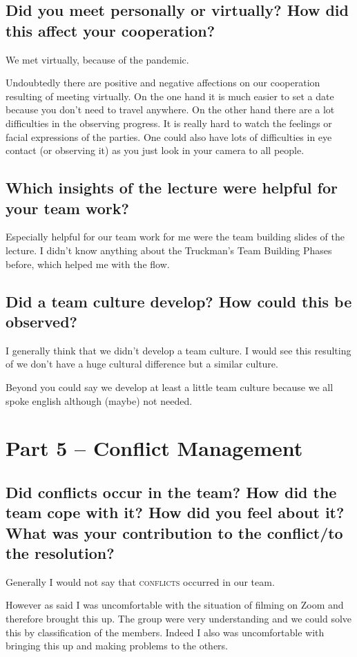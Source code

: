 \documentclass[11pt,fleqn]{book} %
\begin{document}
\subsection{Did you meet personally or virtually? How did this affect your cooperation?}
We met virtually, because of the pandemic.

Undoubtedly there are positive and negative affections on our cooperation resulting of meeting virtually.
On the one hand it is much easier to set a date because you don't need to travel anywhere. On the other hand there are a lot difficulties in the observing progress. It is really hard to watch the feelings or facial expressions of the parties. One could also have lots of difficulties in eye contact (or observing it) as you just look in your camera to all people.

\subsection{Which insights of the lecture were helpful for your team work?}
Especially helpful for our team work for me were the team building slides of the lecture. I didn't know anything about the Truckman's Team Building Phases before, which helped me with the flow.

\subsection{Did a team culture develop? How could this be observed?}
I generally think that we didn't develop a team culture.
I would see this resulting of we don't have a huge cultural difference but a similar culture.

Beyond you could say we develop at least a little team culture because we all spoke english although (maybe) not needed.

\section{Part 5 – Conflict Management}
\subsection{Did conflicts occur in the team? How did the team cope with it? How did you feel about it? What was your contribution to the conflict/to the resolution?}
Generally I would not say that \textsc{conflicts} occurred in our team.

However as said I was uncomfortable with the situation of filming on Zoom and therefore brought this up. The group were very understanding and we could solve this by classification of the members. Indeed I also was uncomfortable with bringing this up and making problems to the others.
\end{document}
